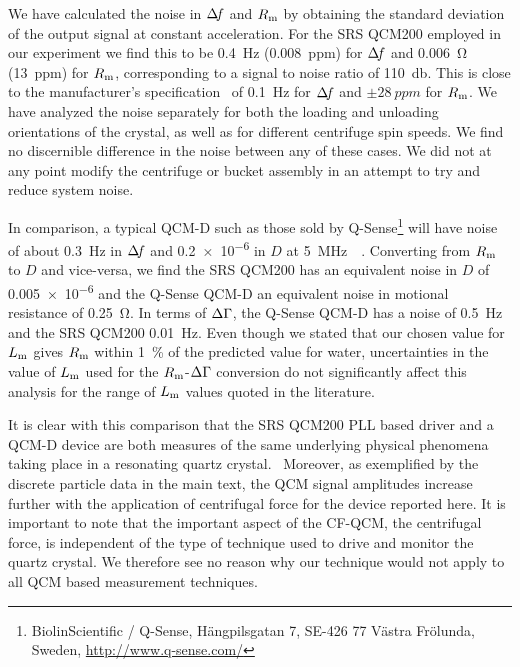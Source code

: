 We have calculated the noise in $\Delta\!f$ and $R_\mathrm{m}$ by obtaining the standard
deviation of the output signal at constant acceleration.  For the SRS
QCM200 employed in our experiment we find this to be \SI{0.4}{\hertz}
(\SI{0.008}{ppm}) for $\Delta\!f$ and \SI{0.006}{\ohm} (\SI{13}{ppm}) for $R_\mathrm{m}$,
corresponding to a signal to noise ratio of \SI{110}{\decibel}.  This is
close to the manufacturer's specification~\cite{srsqcm200manual} of
\SI{0.1}{\hertz} for $\Delta\!f$ and $\pm\SI{28}{ppm}$ for $R_\mathrm{m}$.  We have
analyzed the noise separately for both the loading and unloading
orientations of the crystal, as well as for different centrifuge spin
speeds.  We find no discernible difference in the noise between any of
these cases.  We did not at any point modify the centrifuge or bucket
assembly in an attempt to try and reduce system noise.

In comparison, a typical QCM-D such as those sold by
Q-Sense\footnote{BiolinScientific / Q-Sense, Hängpilsgatan 7, SE-426 77
Västra Frölunda, Sweden,  \url{http://www.q-sense.com/}} will have noise of
about \SI{0.3}{\hertz} in $\Delta\!f$ and \num{0.2e-6} in $D$ at
\SI{5}{\mega\hertz}~\cite{su2005comparison}~\cite{peh2007understanding}.
Converting from $R_\mathrm{m}$ to $D$ and vice-versa, we find the SRS QCM200 has an
equivalent noise in $D$ of \num{0.005e-6} and the Q-Sense QCM-D an
equivalent noise in motional resistance of \SI{0.25}{\ohm}.  In terms of
$\Delta\Gamma$, the Q-Sense QCM-D has a noise of \SI{0.5}{\hertz} and the SRS QCM200
\SI{0.01}{\hertz}.  Even though we stated that our chosen value for $L_\mathrm{m}$
gives $R_\mathrm{m}$ within \SI{1}{\percent} of the predicted value for water,
uncertainties in the value of $L_\mathrm{m}$ used for the $R_\mathrm{m}$-$\Delta\Gamma$ conversion do
not significantly affect this analysis for the range of $L_\mathrm{m}$ values quoted
in the literature.

It is clear with this comparison that the SRS QCM200 PLL based driver and a
QCM-D device are both measures of the same underlying physical phenomena
taking place in a resonating quartz crystal.~\cite{geelhood2002transient}
Moreover, as exemplified by the discrete particle data in the main text,
the QCM signal amplitudes increase further with the application of
centrifugal force for the device reported here.  It is important to note
that the important aspect of the CF-QCM, the centrifugal force, is
independent of the type of technique used to drive and monitor the quartz
crystal.  We therefore see no reason why our technique would not apply to
all QCM based measurement techniques.  

